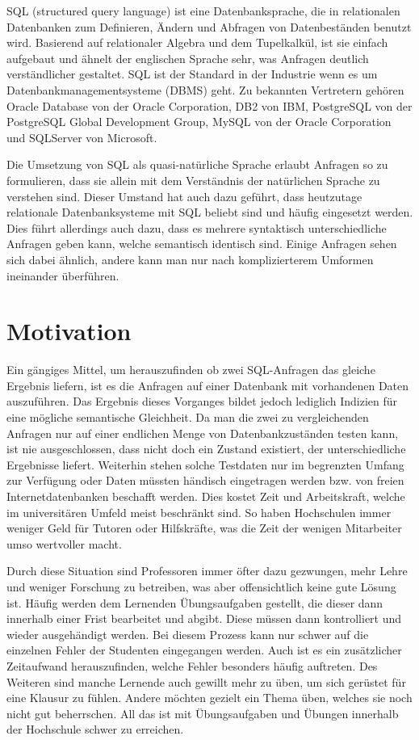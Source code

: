 
SQL (structured query language) ist eine Datenbanksprache, die in relationalen Datenbanken zum Definieren, Ändern und Abfragen von Datenbeständen benutzt wird. Basierend auf relationaler Algebra und dem Tupelkalkül, ist sie einfach aufgebaut und ähnelt der englischen Sprache sehr, was Anfragen deutlich verständlicher gestaltet. SQL ist der Standard in der Industrie wenn es um Datenbankmanagementsysteme (DBMS) geht. Zu bekannten Vertretern gehören Oracle Database von der Oracle Corporation, DB2 von IBM, PostgreSQL von der PostgreSQL Global Development Group, MySQL von der Oracle Corporation und SQLServer von Microsoft.

Die Umsetzung von SQL als quasi-natürliche Sprache erlaubt Anfragen so zu formulieren, dass sie allein mit dem Verständnis der natürlichen Sprache zu verstehen sind. Dieser Umstand hat auch dazu geführt, dass heutzutage relationale Datenbanksysteme mit SQL beliebt sind und häufig eingesetzt werden. 
Dies führt allerdings auch dazu, dass es mehrere syntaktisch unterschiedliche Anfragen geben kann, welche semantisch identisch sind. Einige Anfragen sehen sich dabei ähnlich, andere kann man nur nach komplizierterem Umformen ineinander überführen. 

\section{Motivation}

Ein gängiges Mittel, um herauszufinden ob zwei SQL-Anfragen das gleiche Ergebnis liefern, ist es die Anfragen auf einer Datenbank mit vorhandenen Daten auszuführen. Das Ergebnis dieses Vorganges bildet jedoch lediglich Indizien für eine mögliche semantische Gleichheit. Da man die zwei zu vergleichenden Anfragen nur auf einer endlichen Menge von Datenbankzuständen testen kann, ist nie ausgeschlossen, dass nicht doch ein Zustand existiert, der unterschiedliche Ergebnisse liefert. Weiterhin stehen solche Testdaten nur im begrenzten Umfang zur Verfügung oder Daten müssten händisch eingetragen werden bzw. von freien Internetdatenbanken beschafft werden. Dies kostet Zeit und Arbeitskraft, welche im universitären Umfeld meist beschränkt sind. So haben Hochschulen immer weniger Geld für Tutoren oder Hilfskräfte, was die Zeit der wenigen Mitarbeiter umso wertvoller macht.

Durch diese Situation sind Professoren immer öfter dazu gezwungen, mehr Lehre und weniger Forschung zu betreiben, was aber offensichtlich keine gute Lösung ist. Häufig werden dem Lernenden Übungsaufgaben gestellt, die dieser dann innerhalb einer Frist bearbeitet und abgibt. Diese müssen dann kontrolliert und wieder ausgehändigt werden. Bei diesem Prozess kann nur schwer auf die einzelnen Fehler der Studenten eingegangen werden. Auch ist es ein zusätzlicher Zeitaufwand herauszufinden, welche Fehler besonders häufig auftreten. Des Weiteren sind manche Lernende auch gewillt mehr zu üben, um sich gerüstet für eine Klausur zu fühlen. Andere möchten gezielt ein Thema üben, welches sie noch nicht gut beherrschen. All das ist mit Übungsaufgaben und Übungen innerhalb der Hochschule schwer zu erreichen. 

